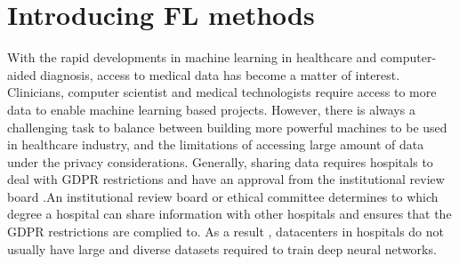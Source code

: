 













\section{Introducing FL methods}

With the rapid developments in machine learning in healthcare and computer-aided diagnosis, access to medical data has become a matter of interest. Clinicians, computer scientist and medical technologists require access to more data to enable machine learning based projects. However, there is always a challenging task to balance between building more powerful machines to be used in healthcare industry, and the limitations of accessing large amount of data under the privacy considerations. Generally, sharing data requires hospitals to deal with GDPR restrictions and have an approval from the institutional review board .An institutional review board or ethical committee determines to which degree a hospital can share information with other hospitals and ensures that the GDPR restrictions are complied to. As a result , datacenters in hospitals do not usually have large and diverse datasets required to train deep neural networks. 

